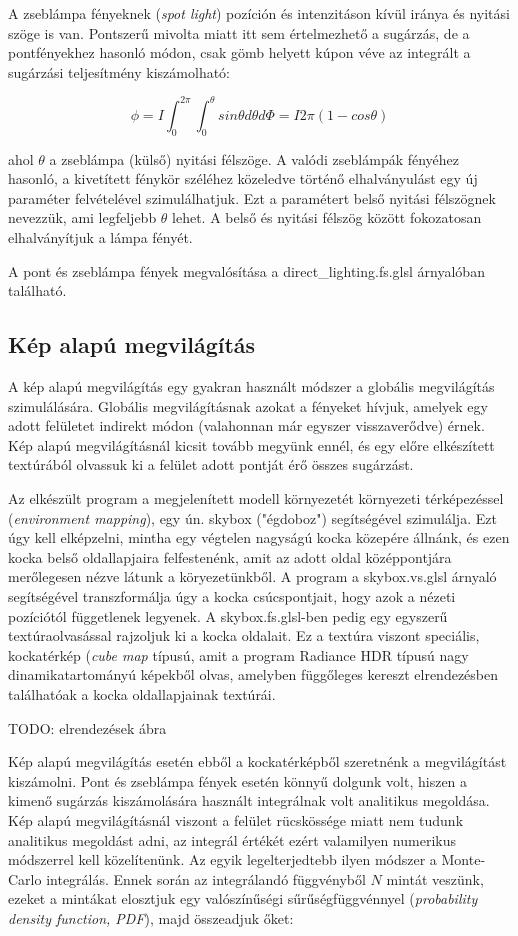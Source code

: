 A zseblámpa fényeknek (\textit{spot light}) pozíción és intenzitáson kívül iránya és nyitási szöge is van. Pontszerű mivolta miatt itt sem értelmezhető a sugárzás, de a pontfényekhez hasonló módon, csak gömb helyett kúpon véve az integrált a sugárzási teljesítmény kiszámolható:

\[
\phi = I \int_0^{2\pi} { \int_0^\theta { sin\theta d\theta d\Phi } } = I 2\pi (1 - cos\theta)
\]

ahol \(\theta\) a zseblámpa (külső) nyitási félszöge. A valódi zseblámpák fényéhez hasonló, a kivetített fénykör széléhez közeledve történő elhalványulást egy új paraméter felvételével szimulálhatjuk. Ezt a paramétert belső nyitási félszögnek nevezzük, ami legfeljebb \(\theta\) lehet. A belső és nyitási félszög között fokozatosan elhalványítjuk a lámpa fényét.

A pont és zseblámpa fények megvalósítása a direct\_lighting.fs.glsl árnyalóban található.

\subsection{Kép alapú megvilágítás}

A kép alapú megvilágítás egy gyakran használt módszer a globális megvilágítás szimulálására. Globális megvilágításnak azokat a fényeket hívjuk, amelyek egy adott felületet indirekt módon (valahonnan már egyszer visszaverődve) érnek. Kép alapú megvilágításnál kicsit tovább megyünk ennél, és egy előre elkészített textúrából olvassuk ki a felület adott pontját érő összes sugárzást.

Az elkészült program a megjelenített modell környezetét környezeti térképezéssel (\textit{environment mapping}), egy ún. skybox ("égdoboz") segítségével szimulálja. Ezt úgy kell elképzelni, mintha egy végtelen nagyságú kocka közepére állnánk, és ezen kocka belső oldallapjaira felfestenénk, amit az adott oldal középpontjára merőlegesen nézve látunk a köryezetünkből. A program a skybox.vs.glsl árnyaló segítségével transzformálja úgy a kocka csúcspontjait, hogy azok a nézeti pozíciótól függetlenek legyenek. A skybox.fs.glsl-ben pedig egy egyszerű textúraolvasással rajzoljuk ki a kocka oldalait. Ez a textúra viszont speciális, kockatérkép (\textit{cube map} típusú, amit a program Radiance HDR típusú nagy dinamikatartományú képekből olvas, amelyben függőleges kereszt elrendezésben találhatóak a kocka oldallapjainak textúrái.

TODO: elrendezések ábra

Kép alapú megvilágítás esetén ebből a kockatérképből szeretnénk a megvilágítást kiszámolni. Pont és zseblámpa fények esetén könnyű dolgunk volt, hiszen a kimenő sugárzás kiszámolására használt integrálnak volt analitikus megoldása. Kép alapú megvilágításnál viszont a felület rücskössége miatt nem tudunk analitikus megoldást adni, az integrál értékét ezért valamilyen numerikus módszerrel kell közelítenünk. Az egyik legelterjedtebb ilyen módszer a Monte-Carlo integrálás. Ennek során az integrálandó függvényből \(N\) mintát veszünk, ezeket a mintákat elosztjuk egy valószínűségi sűrűségfüggvénnyel (\textit{probability density function, PDF}), majd összeadjuk őket:

